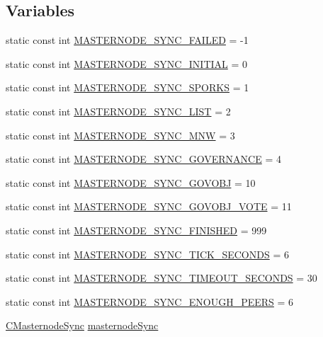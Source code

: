 \subsection*{Variables}
\begin{DoxyCompactItemize}
\item 
static const int \mbox{\hyperlink{masternode-sync_8h_a6b64f59b1b45b0b6efbec570fd77a582}{M\+A\+S\+T\+E\+R\+N\+O\+D\+E\+\_\+\+S\+Y\+N\+C\+\_\+\+F\+A\+I\+L\+ED}} = -\/1
\item 
static const int \mbox{\hyperlink{masternode-sync_8h_a7b8a89431b4c5523d73827c1c44d455f}{M\+A\+S\+T\+E\+R\+N\+O\+D\+E\+\_\+\+S\+Y\+N\+C\+\_\+\+I\+N\+I\+T\+I\+AL}} = 0
\item 
static const int \mbox{\hyperlink{masternode-sync_8h_a636ade4c0d20a8f39e92d74110f006eb}{M\+A\+S\+T\+E\+R\+N\+O\+D\+E\+\_\+\+S\+Y\+N\+C\+\_\+\+S\+P\+O\+R\+KS}} = 1
\item 
static const int \mbox{\hyperlink{masternode-sync_8h_a2e35d5f36dba7d57f6d06ef17058a71c}{M\+A\+S\+T\+E\+R\+N\+O\+D\+E\+\_\+\+S\+Y\+N\+C\+\_\+\+L\+I\+ST}} = 2
\item 
static const int \mbox{\hyperlink{masternode-sync_8h_aeac6d5a06d77deebcb7f046a1b7af700}{M\+A\+S\+T\+E\+R\+N\+O\+D\+E\+\_\+\+S\+Y\+N\+C\+\_\+\+M\+NW}} = 3
\item 
static const int \mbox{\hyperlink{masternode-sync_8h_acf9ee8fca8edd12a52b7695083289456}{M\+A\+S\+T\+E\+R\+N\+O\+D\+E\+\_\+\+S\+Y\+N\+C\+\_\+\+G\+O\+V\+E\+R\+N\+A\+N\+CE}} = 4
\item 
static const int \mbox{\hyperlink{masternode-sync_8h_a31ca4df2ea4acff3727d28193f2080fb}{M\+A\+S\+T\+E\+R\+N\+O\+D\+E\+\_\+\+S\+Y\+N\+C\+\_\+\+G\+O\+V\+O\+BJ}} = 10
\item 
static const int \mbox{\hyperlink{masternode-sync_8h_a0b0d6538a8aa521075b6602cb964d457}{M\+A\+S\+T\+E\+R\+N\+O\+D\+E\+\_\+\+S\+Y\+N\+C\+\_\+\+G\+O\+V\+O\+B\+J\+\_\+\+V\+O\+TE}} = 11
\item 
static const int \mbox{\hyperlink{masternode-sync_8h_af6c1fb62386c3dee7442700d40f2479c}{M\+A\+S\+T\+E\+R\+N\+O\+D\+E\+\_\+\+S\+Y\+N\+C\+\_\+\+F\+I\+N\+I\+S\+H\+ED}} = 999
\item 
static const int \mbox{\hyperlink{masternode-sync_8h_ad4113651adb0feb375f2d5b471819ca7}{M\+A\+S\+T\+E\+R\+N\+O\+D\+E\+\_\+\+S\+Y\+N\+C\+\_\+\+T\+I\+C\+K\+\_\+\+S\+E\+C\+O\+N\+DS}} = 6
\item 
static const int \mbox{\hyperlink{masternode-sync_8h_aa86deac4f4f6107beb0c5f7a4daeebc9}{M\+A\+S\+T\+E\+R\+N\+O\+D\+E\+\_\+\+S\+Y\+N\+C\+\_\+\+T\+I\+M\+E\+O\+U\+T\+\_\+\+S\+E\+C\+O\+N\+DS}} = 30
\item 
static const int \mbox{\hyperlink{masternode-sync_8h_ac85b2d6990fd3cd894dcb704ef6992a4}{M\+A\+S\+T\+E\+R\+N\+O\+D\+E\+\_\+\+S\+Y\+N\+C\+\_\+\+E\+N\+O\+U\+G\+H\+\_\+\+P\+E\+E\+RS}} = 6
\item 
\mbox{\hyperlink{class_c_masternode_sync}{C\+Masternode\+Sync}} \mbox{\hyperlink{masternode-sync_8h_a9807e6586e8a7cb25799ea4150520448}{masternode\+Sync}}
\end{DoxyCompactItemize}


